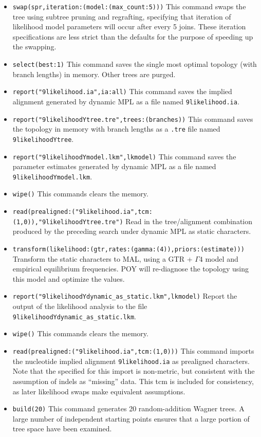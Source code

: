 \begin{itemize}
\item \texttt{swap(spr,iteration:(model:(max\_count:5)))} This command swaps the tree using subtree pruning and regrafting, specifying that iteration of likelihood model parameters will occur after every 5 joins. These iteration specifications are less strict than the defaults for the purpose of speeding up the swapping.
\item \texttt{select(best:1)} This command saves the single most optimal topology (with branch lengths) in memory. Other trees are purged.
\item \texttt{report("9likelihood.ia",ia:all)} This command saves the implied
    alignment generated by dynamic MPL as a file named \texttt{9likelihood.ia}.
\item \texttt{report("9likelihoodYtree.tre",trees:(branches))} This command saves the topology in memory with branch lengths as a \texttt{.tre} file named \texttt{9likelihoodYtree}.
\item \texttt{report("9likelihoodYmodel.lkm",lkmodel)} This command saves the parameter estimates generated by dynamic MPL as a file named \texttt{9likelihoodYmodel.lkm}.
\item \texttt{wipe()} This commands clears the memory.
\item \texttt{read(prealigned:("9likelihood.ia",tcm:(1,0)),"9likelihoodYtree.tre")} Read in the tree/alignment combination produced by the preceding search under dynamic MPL as static characters.
\item \texttt{transform(likelihood:(gtr,rates:(gamma:(4)),priors:(estimate)))} Transform the static characters to MAL, using a GTR + $\Gamma 4$ model and empirical equilibrium frequencies. POY will re-diagnose the topology using this model and optimize the values.
\item \texttt{report("9likelihoodYdynamic\_as\_static.lkm",lkmodel)} Report the output of the likelihood analysis to the file \texttt{9likelihoodYdynamic\_as\_static.lkm}.
\item \texttt{wipe()} This commands clears the memory.
\item \texttt{read(prealigned:("9likelihood.ia",tcm:(1,0)))} This command
    imports the nucleotide implied alignment \texttt{9likelihood.ia} as prealigned characters. Note that the  specified for this import is non-metric, but consistent with the assumption of indels as ``missing'' data. This tcm is included for consistency, as later likelihood swaps make equivalent assumptions.
\item \texttt{build(20)} This command generates 20 random-addition Wagner trees. A large number of independent starting points ensures that a large portion of tree space have been examined.

\end{itemize}
